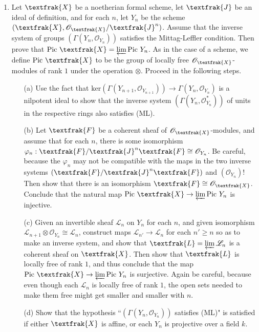 \documentclass[12pt]{article}
\newcommand{\goth}[1]{\textfrak{#1}}
\newcommand{\pic}[1]{\text{Pic}~#1}
\newcommand{\gF}{\goth{F}}
\newcommand{\OO}{\mathscr{O}}
\begin{document}
\begin{enumerate} [label=\textbf{\arabic*.}, leftmargin=0em]
\item Let $\goth{X}$ be a noetherian formal scheme, let $\goth{J}$ be an ideal of definition, and for each $n$, let $Y_n$ be the scheme $(\goth{X}, \OO_\goth{X} / \goth{J}^n)$. Assume that the inverse system of groups $(\Gamma(Y_n, \OO_{Y_n}))$ satisfies the Mittag-Leffler condition. Then prove that $\pic{\goth{X}} = \varprojlim \pic{Y_n}$. As in the case of a scheme, we define $\pic{\goth{X}}$ to be the group of locally free $\OO_\goth{X}$-modules of rank $1$ under the operation $\otimes$. Proceed in the following steps.
\begin{itemize}
    \item[(a)] Use the fact that $\text{ker}(\Gamma(Y_{n + 1}, \OO_{Y_{n + 1}})) \to \Gamma(Y_n, \OO_{Y_n})$ is a nilpotent ideal to show that the inverse system $(\Gamma(Y_n, \OO_{Y_n}^*))$ of units in the respective rings also satisfies (ML).
    \item[(b)] Let $\gF$ be a coherent sheaf of $\OO_\goth{X}$-modules, and assume that for each $n$, there is some isomorphism $\varphi_n : \gF / \goth{J}^n \gF \cong \OO_{Y_n}$. Be careful, because the $\varphi_n$ may not be compatible with the maps in the two inverse systems $(\gF / \goth{J}^n \gF)$ and $(\OO_{Y_n})$! Then show that there is an isomorphism $\gF \cong \OO_\goth{X}$. Conclude that the natural map $\pic{\goth{X}} \to \varprojlim{\pic{Y_n}}$ is injective.
    \item[(c)] Given an invertible sheaf $\mathscr{L}_n$ on $Y_n$ for each $n$, and given isomorphism $\mathscr{L}_{n + 1} \otimes \OO_{Y_n} \cong \mathscr{L}_n$, construct maps $\mathscr{L}_{n'} \to \mathscr{L}_n$ for each $n' \geq n$ so as to make an inverse system, and show that $\goth{L} = \varprojlim \mathscr{L}_n$ is a coherent sheaf on $\goth{X}$. Then show that $\goth{L}$ is locally free of rank $1$, and thus conclude that the map $\pic{\goth{X}} \to \varprojlim \pic{Y_n}$ is surjective. Again be careful, because even though each $\mathscr{L}_n$ is locally free of rank $1$, the open sets needed to make them free might get smaller and smaller with $n$.
    \item[(d)] Show that the hypothesis ``$(\Gamma(Y_n, \OO_{Y_n}))$ satisfies (ML)" is satisfied if either $\goth{X}$ is affine, or each $Y_n$ is projective over a field $k$.
\end{itemize}

\end{enumerate}
\end{document}
